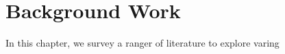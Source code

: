 \chapter{Background Work}
\label{ch:background_work}

In this chapter, we survey a ranger of literature to explore varing 


